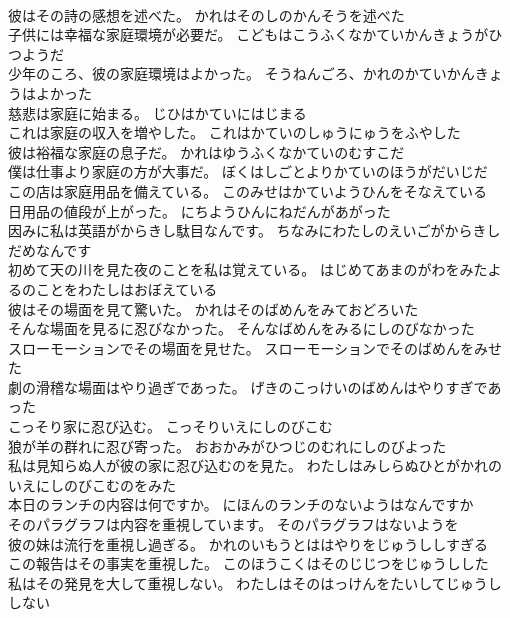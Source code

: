 \documentclass[8pt]{extreport}
\begin{document}
\begin{CJK}{UTF8}{min}
\\	彼はその詩の感想を述べた。	かれはそのしのかんそうを述べた 
\\	子供には幸福な家庭環境が必要だ。	こどもはこうふくなかていかんきょうがひつようだ 
\\	少年のころ、彼の家庭環境はよかった。	そうねんごろ、かれのかていかんきょうはよかった 
\\	慈悲は家庭に始まる。	じひはかていにはじまる 
\\	これは家庭の収入を増やした。	これはかていのしゅうにゅうをふやした 
\\	彼は裕福な家庭の息子だ。	かれはゆうふくなかていのむすこだ 
\\	僕は仕事より家庭の方が大事だ。	ぼくはしごとよりかていのほうがだいじだ 
\\	この店は家庭用品を備えている。	このみせはかていようひんをそなえている 
\\	日用品の値段が上がった。	にちようひんにねだんがあがった 
\\	因みに私は英語がからきし駄目なんです。	ちなみにわたしのえいごがからきしだめなんです 
\\	初めて天の川を見た夜のことを私は覚えている。	はじめてあまのがわをみたよるのことをわたしはおぼえている 
\\	彼はその場面を見て驚いた。	かれはそのばめんをみておどろいた 
\\	そんな場面を見るに忍びなかった。	そんなばめんをみるにしのびなかった 
\\	スローモーションでその場面を見せた。	スローモーションでそのばめんをみせた 
\\	劇の滑稽な場面はやり過ぎであった。	げきのこっけいのばめんはやりすぎであった 
\\	こっそり家に忍び込む。	こっそりいえにしのびこむ 
\\	狼が羊の群れに忍び寄った。	おおかみがひつじのむれにしのびよった 
\\	私は見知らぬ人が彼の家に忍び込むのを見た。	わたしはみしらぬひとがかれのいえにしのびこむのをみた 
\\	本日のランチの内容は何ですか。	にほんのランチのないようはなんですか 
\\	そのパラグラフは内容を重視しています。	そのパラグラフはないようを 
\\	彼の妹は流行を重視し過ぎる。	かれのいもうとははやりをじゅうししすぎる 
\\	この報告はその事実を重視した。	このほうこくはそのじじつをじゅうしした 
\\	私はその発見を大して重視しない。	わたしはそのはっけんをたいしてじゅうししない 

\end{CJK}
\end{document}
